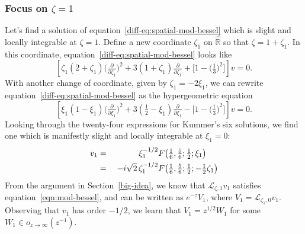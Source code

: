 \documentclass{article}
\theoremstyle{plain}
\newcommand{\R}{\mathbb{R}}
\newcommand{\laplace}{\mathcal{L}}
\begin{document}
\subsubsection{Focus on $\zeta = 1$}\label{pos-root}
Let's find a solution of equation~\ref{diff-eq:spatial-mod-bessel} which is slight and locally integrable at $\zeta = 1$. Define a new coordinate $\zeta_1$ on $\hat{\R}$ so that $\zeta = 1 + \zeta_1$. In this coordinate, equation~\ref{diff-eq:spatial-mod-bessel} looks like
\begin{equation}%
\left[\zeta_1(2 + \zeta_1) \big(\tfrac{\partial}{\partial \zeta_1}\big)^2 + 3(1 + \zeta_1) \tfrac{\partial}{\partial \zeta_1} + \big[1 - \big(\tfrac{1}{3}\big)^2\big]\right] v = 0.
\end{equation}
With another change of coordinate, given by $\zeta_1 = -2\xi_1$, we can rewrite equation~\ref{diff-eq:spatial-mod-bessel} as the hypergeometric equation
\begin{equation}\label{diff-eq:hypergeom-pos}
\left[\xi_1 (1 - \xi_1) \big(\tfrac{\partial}{\partial \xi_1}\big)^2 + 3(\tfrac{1}{2} - \xi_1) \tfrac{\partial}{\partial \xi_1} - \big[1 - \big(\tfrac{1}{3}\big)^2\big]\right] v = 0.
\end{equation}
Looking through the twenty-four expressions for Kummer's six solutions, we find one \cite[formula~15.10.12]{dlmf} which is manifestly slight and locally integrable at $\xi_1 = 0$:
\begin{alignat*}{2}
v_1 &=\;& \hphantom{-i\sqrt{2}}\,\xi_1^{-1/2} & F\big(\tfrac{1}{6}, \tfrac{5}{6}; \tfrac{1}{2}; \xi_1\big) \\
&=\;& -i\sqrt{2}\,\zeta_1^{-1/2} & F\big(\tfrac{1}{6}, \tfrac{5}{6}; \tfrac{1}{2}; -\tfrac{1}{2}\zeta_1\big)
\end{alignat*}
From the argument in Section~\ref{big-idea}, we know that $\laplace_{\zeta, 1} v_1$ satisfies equation~\ref{eqn:mod-bessel}, and can be written as $e^{-z} V_1$, where $V_1 = \laplace_{\zeta_1, 0} v_1$. Observing that $v_1$ has order $-1/2$, we learn that $V_1 = z^{1/2} W_1$ for some $W_1 \in o_{z \to \infty}(z^{-1})$.
\end{document}
